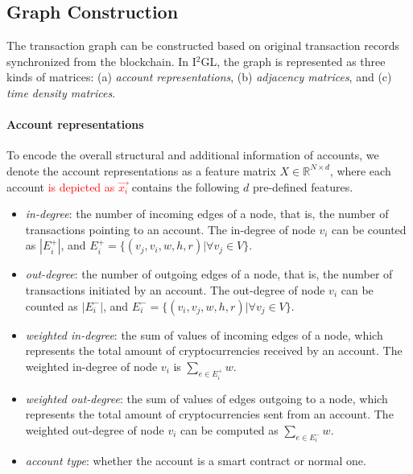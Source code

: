\subsection{Graph Construction}
The transaction graph can be constructed based on original transaction records synchronized from the blockchain. In I$^2$GL, the graph is represented as three kinds of matrices: (a) \emph{account representations}, (b) \emph{adjacency matrices}, and (c) \emph{time density matrices}.




\paragraph{Account representations} To encode the overall structural and additional information of accounts, we denote the account representations as a feature matrix $X \in \mathbb{R}^{N \times d}$, where each account \textcolor{red}{is depicted as $\vec{x_i}$} contains the following $d$ pre-defined features.

\begin{itemize}
	\item \emph{in-degree}: the number of incoming edges of a node, that is, the number of transactions pointing to an account. The in-degree of node $v_i$ can be counted as $|E_{i}^{+}|$, and $E_{i}^{+}=\{(v_j,v_i,w,h,r)| \forall v_j \in V\}$.
	\item \emph{out-degree}: the number of outgoing edges of a node, that is, the number of transactions initiated by an account. The out-degree of node $v_i$ can be counted as $|E_{i}^{-}|$, and $E_{i}^{-}=\{(v_i,v_j,w,h,r)| \forall v_j \in V\}$.
	\item \emph{weighted in-degree}: the sum of values of incoming edges of a node, which represents the total amount of cryptocurrencies received by an account. The weighted in-degree of node $v_i$ is $\sum_{e\in E_{i}^{+}}w$.
	\item \emph{weighted out-degree}: the sum of values of edges outgoing to a node, which represents the total amount of cryptocurrencies sent from an account. The weighted out-degree of node $v_i$ can be computed as $\sum_{e\in E_{i}^{-}}w$.
	\item \emph{account type}: whether the account is a smart contract or normal one.
\end{itemize}

